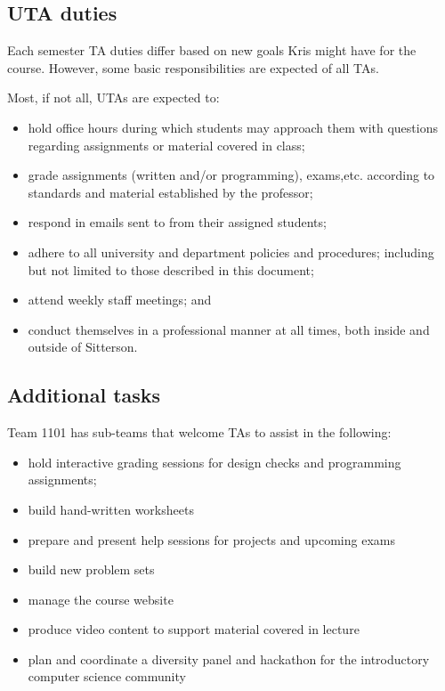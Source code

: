 \documentclass[a4paper]{article}
\begin{document}
\subsection{UTA duties}
Each semester TA duties differ based on new goals Kris might have for the course. However, some basic responsibilities are expected of all TAs.
\begin{flushleft}
Most, if not all, UTAs are expected to:
\end{flushleft}
\begin{itemize}
\item hold office hours during which students may approach them with questions regarding assignments or material covered in class; 
\item grade assignments (written and/or programming), exams,etc. according to standards and material established by the professor; 
\item respond in emails sent to from their assigned students; 

\item adhere to all university and department policies and procedures; including but not limited to those described in this document; 
\item attend weekly staff meetings; and
\item conduct themselves in a professional manner at all times, both inside and outside of Sitterson. 
\end{itemize}
\subsection{Additional tasks}
Team 1101 has sub-teams that welcome TAs to assist in the following:
\begin{itemize}
\item hold interactive grading sessions for design checks and programming assignments; 
\item build hand-written worksheets
\item prepare and present help sessions for projects and upcoming exams
\item build new problem sets
\item manage the course website
\item produce video content to support material covered in lecture
\item plan and coordinate a diversity panel and hackathon for the introductory computer science community
\end{itemize}
\end{document}
